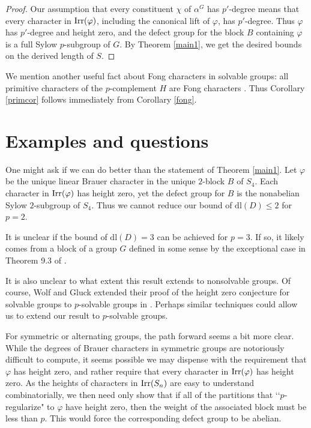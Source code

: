 \documentclass[11pt]{amsart}
\newcommand \irr {\textup{Irr}}
\newcommand{\dl}{\mathrm {dl}}
\begin{document}
\begin{proof}  Our assumption that every constituent $\chi$ of $\alpha^G$ has $p'$-degree means that every character in $\irr(\varphi)$, including the canonical lift of $\varphi$, has $p'$-degree.  Thus $\varphi$ has $p'$-degree and height zero, and the defect group for the block $B$ containing $\varphi$ is a full Sylow $p$-subgroup of $G$.  By Theorem \ref{main1}, we get the desired bounds on the derived length of $S$.
\end{proof}

We mention another useful fact about Fong characters in solvable groups:  all primitive characters of the $p$-complement $H$ are Fong characters \cite{isaacsfong}.  Thus Corollary \ref{primcor} follows immediately from Corollary \ref{fong}.

\section{Examples and questions}

One might ask if we can do better than the statement of Theorem \ref{main1}.   Let $\varphi$ be the unique linear Brauer character in the unique $2$-block $B$ of $S_4$.  Each character in $\irr(\varphi)$ has height zero, yet the defect group for $B$ is the nonabelian Sylow $2$-subgroup of $S_4$.  Thus we cannot reduce our bound of $\dl(D) \leq 2$ for $p = 2$.

It is unclear if the bound of $\dl(D) =3$ can be achieved for $p = 3$.  If so, it likely comes from a block of a group $G$ defined in some sense by the exceptional case in Theorem 9.3 of \cite{manzwolf}.

It is also unclear to what extent this result extends to nonsolvable groups.  Of course, Wolf and Gluck extended their proof of the height zero conjecture for solvable groups to $p$-solvable groups in \cite{gluckwolf}.  Perhaps similar techniques could allow us to extend our result to $p$-solvable groups.

For symmetric or alternating groups, the path forward seems a bit more clear.  While the degrees of Brauer characters in symmetric groups are notoriously difficult to compute, it seems possible we may dispense with the requirement that $\varphi$ has height zero, and rather require that every character in $\irr(\varphi)$ has height zero.  As the heights of characters in $\irr(S_n)$ are easy to understand combinatorially, we then need only show that if all of the partitions that \lq \lq $p$-regularize" to $\varphi$ have height zero, then the weight of the associated block must be less than $p$.  This would force the corresponding defect group to be abelian.
\end{document}
